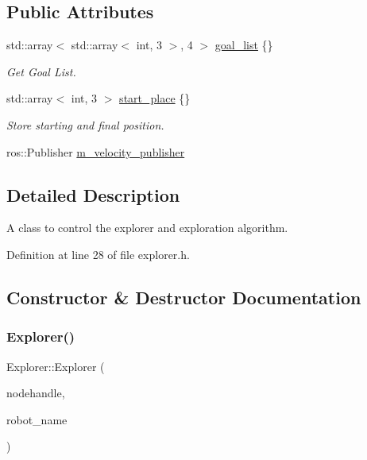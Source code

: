 \subsection*{Public Attributes}
\begin{DoxyCompactItemize}
\item 
std\+::array$<$ std\+::array$<$ int, 3 $>$, 4 $>$ \hyperlink{class_explorer_acda1856f421dfe836f39de446415b969}{goal\+\_\+list} \{\}
\begin{DoxyCompactList}\small\item\em Get Goal List. \end{DoxyCompactList}\item 
std\+::array$<$ int, 3 $>$ \hyperlink{class_explorer_af1aee46522a58db39d3643f2138c76fa}{start\+\_\+place} \{\}
\begin{DoxyCompactList}\small\item\em Store starting and final position. \end{DoxyCompactList}\item 
ros\+::\+Publisher \hyperlink{class_explorer_aee857cd646f2ce6eb7e017a67e90bcdf}{m\+\_\+velocity\+\_\+publisher}
\end{DoxyCompactItemize}


\subsection{Detailed Description}
A class to control the explorer and exploration algorithm. 

Definition at line 28 of file explorer.\+h.



\subsection{Constructor \& Destructor Documentation}
\mbox{\label{class_explorer_aafe6b7c3b9c2e24815aa14a731f31890}} 
\subsubsection{\texorpdfstring{Explorer()}{Explorer()}}
{\footnotesize\ttfamily Explorer\+::\+Explorer (\begin{DoxyParamCaption}\item[{ros\+::\+Node\+Handle $\ast$}]{nodehandle,  }\item[{const std\+::string \&}]{robot\+\_\+name }\end{DoxyParamCaption})}



